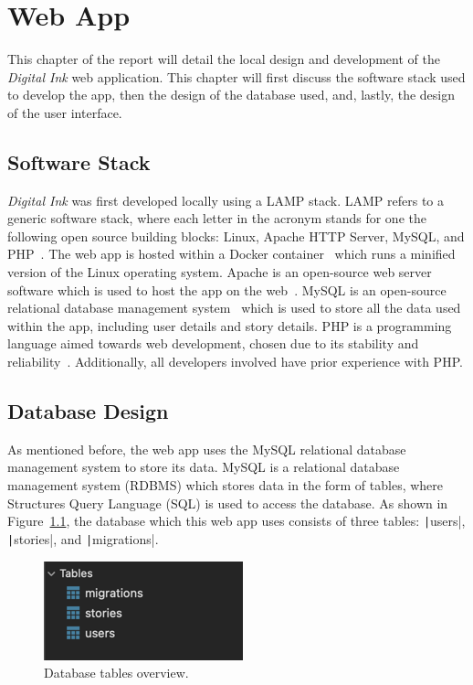 \chapter{Web App}\label{ch:web-app}

This chapter of the report will detail the local design and development of the \textit{Digital Ink} web application.
This chapter will first discuss the software stack used to develop the app, then the design of the database used, and,
lastly, the design of the user interface.

\section{Software Stack}\label{sec:stack}

\textit{Digital Ink} was first developed locally using a LAMP stack.
LAMP refers to a generic software stack, where each letter in the acronym stands for one the following open source
building blocks: Linux, Apache HTTP Server, MySQL, and PHP~\parencite{lee2003open}.
The web app is hosted within a Docker container~\parencite{anderson2015docker} which runs a minified version of the
Linux operating system.
Apache is an open-source web server software which is used to host the app on the web~\parencite{fielding1997apache}.
MySQL is an open-source relational database management system~\parencite{widenius2002mysql} which is used to store all
the data used within the app, including user details and story details.
PHP is a programming language aimed towards web development, chosen due to its stability and
reliability~\parencite{lerdorf2002programming}.
Additionally, all developers involved have prior experience with PHP\@.

\section{Database Design}\label{sec:database}

As mentioned before, the web app uses the MySQL relational database management system to store its data.
MySQL is a relational database management system (RDBMS) which stores data in the form of tables, where Structures Query
Language (SQL) is used to access the database.
As shown in Figure~\ref{fig:tables-overview}, the database which this web app uses consists of three tables:
\texttt|users|, \texttt|stories|, and \texttt|migrations|.

\begin{figure}[!htbp]
    \centering
    \includegraphics[scale=0.8]{resources/database/tables-overview}
    \caption{Database tables overview.}
    \label{fig:tables-overview}
\end{figure}


